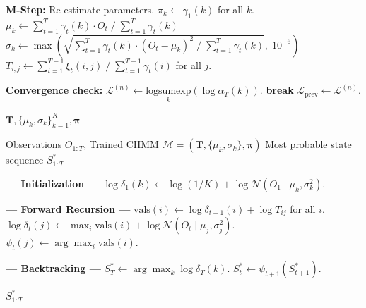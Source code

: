 \begin{algorithm}[tp]
\begin{algorithmic}[1]
    \STATE \textbf{M-Step:} Re-estimate parameters.
    \STATE $\pi_k \leftarrow \gamma_1(k)$ for all $k$.
        \STATE $\mu_k \leftarrow \sum_{t=1}^T \gamma_t(k) \cdot O_t \;/\; \sum_{t=1}^T \gamma_t(k)$
        \STATE $\sigma_k \leftarrow \max\!\left(\sqrt{\sum_{t=1}^T \gamma_t(k) \cdot (O_t - \mu_k)^2 \;/\; \sum_{t=1}^T \gamma_t(k)},\; 10^{-6}\right)$
    \ENDFOR
        \STATE $T_{i,j} \leftarrow \sum_{t=1}^{T-1} \xi_t(i,j) \;/\; \sum_{t=1}^{T-1} \gamma_t(i)$ for all $j$.
    \ENDFOR

    \STATE \textbf{Convergence check:}
    \STATE $\mathcal{L}^{(n)} \leftarrow \underset{k}{\text{logsumexp}}(\log \alpha_T(k))$.
        \STATE \textbf{break}
    \ENDIF
    \STATE $\mathcal{L}_{\text{prev}} \leftarrow \mathcal{L}^{(n)}$.
\ENDFOR

\RETURN $\mathbf{T}, \{\mu_k, \sigma_k\}_{k=1}^K, \boldsymbol{\pi}$
\end{algorithmic}
\end{algorithm}

\begin{algorithm}[tp]
\caption{Viterbi decoding for the most likely hidden state sequence}
\label{alg:viterbi}
\small
\begin{algorithmic}[1]
\REQUIRE Observations $O_{1:T}$, Trained CHMM $\mathcal{M} = (\mathbf{T}, \{\mu_k, \sigma_k\}, \boldsymbol{\pi})$
\ENSURE Most probable state sequence $S_{1:T}^*$

\STATE \textbf{--- Initialization ---}
    \STATE $\log \delta_1(k) \leftarrow \log(1/K) + \log \mathcal{N}(O_1 \mid \mu_k, \sigma_k^2)$.
\ENDFOR

\STATE \textbf{--- Forward Recursion ---}
        \STATE $\text{vals}(i) \leftarrow \log \delta_{t-1}(i) + \log T_{ij}$ for all $i$.
        \STATE $\log \delta_t(j) \leftarrow \max_i \text{vals}(i) + \log \mathcal{N}(O_t \mid \mu_j, \sigma_j^2)$.
        \STATE $\psi_t(j) \leftarrow \arg\max_i \text{vals}(i)$.
    \ENDFOR
\ENDFOR

\STATE \textbf{--- Backtracking ---}
\STATE $S_T^* \leftarrow \arg\max_k \log \delta_T(k)$.
    \STATE $S_t^* \leftarrow \psi_{t+1}(S_{t+1}^*)$.
\ENDFOR

\RETURN $S_{1:T}^*$
\end{algorithmic}
\end{algorithm}

